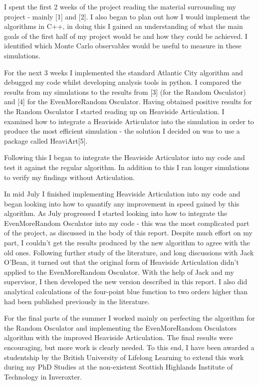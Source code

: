 \documentclass[12pt,a4paper]{report}
\begin{document}
I spent the first 2 weeks of the project reading the material
surrounding my project - mainly [1] and [2]. I also began to plan out
how I would implement the algorithms in C++, in doing this I gained an
understanding of what the main goals of the first half of my project
would be and how they could be achieved. I identified which Monte
Carlo observables would be useful to measure in these simulations.

For the next 3 weeks I implemented the standard Atlantic City
algorithm and debugged my code whilst developing analysis tools in
python. I compared the results from my simulations to the results from
[3] (for the Random Osculator) and [4] for the EvenMoreRandom
Osculator. Having obtained positive results for the Random Osculator I
started reading up on Heaviside Articulation. I examined how to
integrate a Heaviside Articulator into the simulation in order to
produce the most efficient simulation - the solution I decided on was
to use a package called HeaviArt[5].

Following this I began to integrate the Heaviside Articulator into my
code and test it against the regular algorithm. In addition to this I
ran longer simulations to verify my findings without Articulation.

In mid July I finished implementing Heaviside Articulation into my
code and began looking into how to quantify any improvement in speed
gained by this algorithm. As July progressed I started looking into
how to integrate the EvenMoreRandom Osculator into my code - this was
the most complicated part of the project, as discussed in the body of
this report. Despite much effort on my part, I couldn't get the
results produced by the new algorithm to agree with the old
ones. Following further study of the literature, and long discussions
with Jack O'Bean, it turned out that the original form of Heaviside
Articulation didn't applied to the EvenMoreRandom Osculator. With the
help of Jack and my supervisor, I then developed the new version
described in this report. I also did analytical calculations of the
four-point blue function to two orders higher than had
been published previously in the literature.

For the final parts of the summer I worked mainly on perfecting the
algorithm for the Random Osculator and implementing the EvenMoreRandom
Osculators algorithm with the improved Heaviside Articulation. The
final results were encouraging, but more work is clearly needed. To
this end, I have been awarded a studentship by the British University
of Lifelong Learning to extend this work during my PhD Studies at
the non-existent Scottish Highlands Institute of Technology in
Inveroxter.
\end{document}

